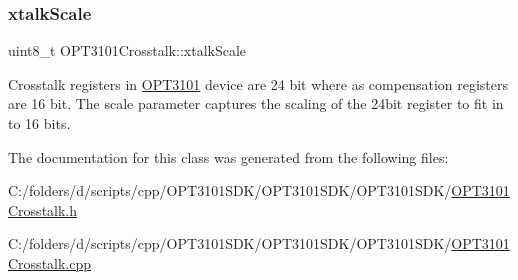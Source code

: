 \subsubsection{\texorpdfstring{xtalk\+Scale}{xtalkScale}}
{\footnotesize\ttfamily uint8\+\_\+t O\+P\+T3101\+Crosstalk\+::xtalk\+Scale}



Crosstalk registers in \mbox{\hyperlink{namespace_o_p_t3101}{O\+P\+T3101}} device are 24 bit where as compensation registers are 16 bit. The scale parameter captures the scaling of the 24bit register to fit in to 16 bits. 



The documentation for this class was generated from the following files\+:\begin{DoxyCompactItemize}
\item 
C\+:/folders/d/scripts/cpp/\+O\+P\+T3101\+S\+D\+K/\+O\+P\+T3101\+S\+D\+K/\+O\+P\+T3101\+S\+D\+K/\mbox{\hyperlink{_o_p_t3101_crosstalk_8h}{O\+P\+T3101\+Crosstalk.\+h}}\item 
C\+:/folders/d/scripts/cpp/\+O\+P\+T3101\+S\+D\+K/\+O\+P\+T3101\+S\+D\+K/\+O\+P\+T3101\+S\+D\+K/\mbox{\hyperlink{_o_p_t3101_crosstalk_8cpp}{O\+P\+T3101\+Crosstalk.\+cpp}}\end{DoxyCompactItemize}
